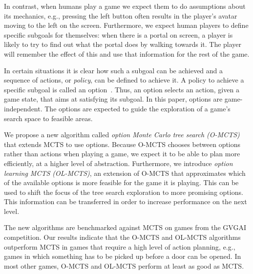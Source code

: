 In contrast, when humans play a game we expect them to do assumptions about its
mechanics, e.g., pressing the left button often results in the player's avatar
moving to the left on the screen.  Furthermore, we expect human players to define
specific subgoals for themselves: when there is a portal on screen, a player is
likely to try to find out what the portal does by walking towards it.  The
player will remember the effect of this and use that information for the rest of
the game.

In certain situations it is clear how such a subgoal can be achieved and a
sequence of actions, or \emph{policy}, can be defined to achieve it. A policy to
achieve a specific subgoal is called an option~\cite{sutton1999between}. Thus,
an option selects an action, given a game state, that aims at satisfying its
subgoal. In this paper, options are game-independent. The options are expected
to guide the exploration of a game's search space to feasible areas.


We propose a new algorithm called \emph{option Monte Carlo tree search (O-MCTS)}
that extends MCTS to use options. Because O-MCTS chooses between options rather
than actions when playing a game, we expect it to be able to plan more
efficiently, at a higher level of abstraction. Furthermore, we introduce
\emph{option learning MCTS (OL-MCTS)}, an extension of O-MCTS that approximates
which of the available options is more feasible for the game it is playing. This
can be used to shift the focus of the tree search exploration to more promising
options. This information can be transferred in order to increase performance on
the next level.

The new algorithms are benchmarked against MCTS on games from the GVGAI
competition. Our results indicate that the O-MCTS and OL-MCTS algorithms
outperform MCTS in games that require a high level of action planning, e.g.,
games in which something has to be picked up before a door can be opened. In
most other games, O-MCTS and OL-MCTS perform at least as good as MCTS\@.
